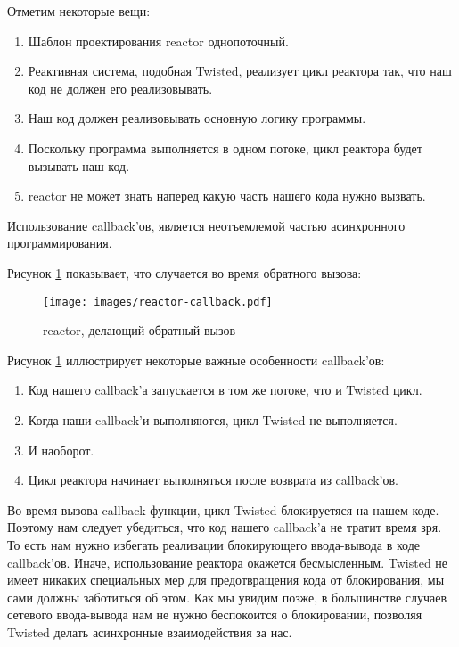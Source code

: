 Отметим некоторые вещи:

\begin{enumerate}
\item Шаблон проектирования reactor однопоточный.
\item Реактивная система, подобная Twisted, реализует цикл 
реактора так, что наш код не должен его реализовывать.
\item Наш код должен реализовывать основную логику программы. 
\item Поскольку программа выполняется в одном потоке, 
цикл реактора будет вызывать наш код.
\item reactor не может знать наперед какую часть нашего кода нужно вызвать.
\end{enumerate}

Использование callback'ов, является неотъемлемой 
частью асинхронного программирования.

\eject

Рисунок \ref{fig:reactor-callback} показывает, что случается во время 
обратного вызова:

\begin{figure}[h]
\begin{center}
    \texttt{[image: images/reactor-callback.pdf]}
    \caption{reactor, делающий обратный вызов\label{fig:reactor-callback}}
\end{center}
\end{figure}


Рисунок \ref{fig:reactor-callback} иллюстрирует некоторые важные особенности 
callback'ов:

\begin{enumerate}
\item Код нашего callback'а запускается в том же потоке, что и Twisted цикл.
\item Когда наши callback'и выполняются, цикл Twisted не выполняется. 
\item И наоборот.
\item Цикл реактора начинает выполняться после возврата из callback'ов.
\end{enumerate}


Во время вызова callback-функции, цикл Twisted 
блокируетяся на нашем коде. Поэтому нам следует 
убедиться, что код нашего callback'а не тратит 
время зря. То есть нам нужно избегать реализации 
блокирующего ввода-вывода в коде callback'ов. 
Иначе, использование реактора окажется бесмысленным. 
Twisted не имеет никаких специальных мер для 
предотвращения кода от блокирования, мы сами 
должны заботиться об этом. Как мы увидим позже, 
в большинстве случаев сетевого ввода-вывода нам не 
нужно беспокоится о блокировании, позволяя Twisted делать 
асинхронные взаимодействия за нас.  


